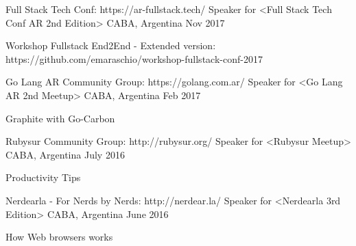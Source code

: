
\begin{cventries}
  \cventry
    {Full Stack Tech Conf: https://ar-fullstack.tech/}
    {Speaker for <Full Stack Tech Conf AR 2nd Edition>}
    {CABA, Argentina}
    {Nov 2017}
    {
      \begin{cvitems}
        \item {Workshop Fullstack End2End - Extended version: https://github.com/emaraschio/workshop-fullstack-conf-2017}
      \end{cvitems}
    }



  \cventry
    {Go Lang AR Community Group: https://golang.com.ar/ }
    {Speaker for <Go Lang AR 2nd Meetup>}
    {CABA, Argentina}
    {Feb 2017}
    {
      \begin{cvitems}
        \item {Graphite with Go-Carbon}
      \end{cvitems}
    }

  \cventry
    {Rubysur Community Group: http://rubysur.org/}
    {Speaker for <Rubysur Meetup>}
    {CABA, Argentina}
    {July 2016}
    {
      \begin{cvitems}
        \item {Productivity Tips}
      \end{cvitems}
    }

  \cventry
    {Nerdearla - For Nerds by Nerds: http://nerdear.la/}
    {Speaker for <Nerdearla 3rd Edition>}
    {CABA, Argentina}
    {June 2016}
    {
      \begin{cvitems}
        \item {How Web browsers works}
      \end{cvitems}
    }


\end{cventries}
